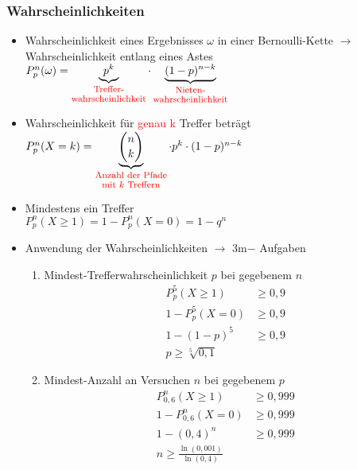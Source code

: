 \documentclass[a4paper,twocolumn,10pt]{onepgnote1}
\begin{document}
\subsubsection{Wahrscheinlichkeiten}
\begin{itemize}
    \item Wahrscheinlichkeit eines Ergebnisses $\omega$ in einer Bernoulli-Kette $\longrightarrow$ Wahrscheinlichkeit entlang eines Astes\\ $P_p^n(\omega) = \underbrace{p^k}_{\shortstack{\textcolor{red}{\footnotesize{Treffer-}}\\ \textcolor{red}{\footnotesize{wahrscheinlichkeit}}}} \cdot
\underbrace{(1 - p)^{n - k}}_{\shortstack{\footnotesize{\textcolor{red}{Nieten-}}\\ \footnotesize{\textcolor{red}{wahrscheinlichkeit}}}}$\\
    \item Wahrscheinlichkeit für \textcolor{red}{genau k} Treffer beträgt\\ $P_p^n(X = k) = \underbrace{\binom{n}{k}}_{\shortstack{\textcolor{red}{\footnotesize{Anzahl der Pfade}}\\ \textcolor{red}{\footnotesize{mit $k$ Treffern}}}} \cdot p^k \cdot (1 - p)^{n - k}$\\
    \item Mindestens ein Treffer\\ $P_p^n(X\geq 1) = 1- P_p^n(X=0) =1-q^n$\\
    \item Anwendung der Wahrscheinlichkeiten $\longrightarrow$ 3m$-$ Aufgaben\\
\begin{enumerate}
    \item Mindest-Trefferwahrscheinlichkeit $p$ bei gegebenem $n$
    \begin{equation*}
        \begin{split}
            P^5_p(X\geq 1) &\geq 0,9\\
            1-P^5_p(X=0)&\geq 0,9\\
            1-(1-p)^5 &\geq 0,9\\
            p\geq \sqrt[5]{0,1}
        \end{split}
    \end{equation*}
    \item Mindest-Anzahl an Versuchen $n$ bei gegebenem $p$
    \begin{equation*}
        \begin{split}
            P^n_{0,6}(X\geq 1) &\geq 0,999\\
            1-P^n_{0,6}(X=0)&\geq 0,999\\
            1-(0,4)^n &\geq 0,999\\
           n\geq \frac{\ln{(0,001)}}{\ln{(0,4)}}
        \end{split}
    \end{equation*}
\end{enumerate}
\end{itemize}
\end{document}

